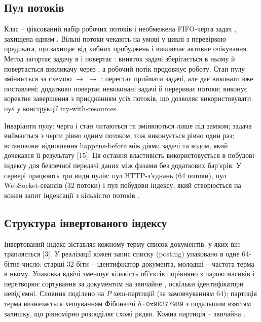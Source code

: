 \subsection{Пул потоків}

Клас  -- фіксований набір робочих потоків і необмежена FIFO-черга задач
, захищена одним . Вільні потоки чекають на
умові  у циклі з перевіркою предиката, що захищає від хибних пробуджень і
виключає активне очікування. Метод  загортає задачу в  і
повертає : виняток задачі зберігається в ньому й повертається викликачу через
, а робочий потік продовжує роботу. Стан пулу змінюється за схемою
 $\rightarrow$  $\rightarrow$ : 
перестає приймати задачі, але дає виконати вже поставлені;  додатково
повертає невиконані задачі й перериває потоки;  виконує коректне завершення з
приєднанням усіх потоків, що дозволяє використовувати пул у конструкції try-with-resources.

Інваріанти пулу: черга і стан читаються та змінюються лише під замком; задача виймається з
черги рівно одним потоком, тож виконується рівно один раз;  встановлює
відношення happens-before між діями задачі та кодом, який дочекався її результату [15]. Ця
остання властивість використовується в побудові індексу для безпечної передачі даних між
фазами без додаткових бар'єрів. У сервері працюють три види пулів: пул HTTP-з'єднань (64
потоки), пул WebSocket-сеансів (32 потоки) і пул побудови індексу, який створюється на кожен
запит індексації з кількістю потоків .

\subsection{Структура інвертованого індексу}

Інвертований індекс зіставляє кожному терму список документів, у яких він трапляється [3].
У реалізації кожен запис списку (posting) упаковано в одне 64-бітне число: старші 32 біти --
ідентифікатор документа, молодші -- частота терма в ньому. Упаковка вдвічі зменшує кількість
об'єктів порівняно з парою масивів і перетворює сортування за документом на звичайне
, оскільки ідентифікатори невід'ємні. Словник поділено на $P$
хеш-партицій (за замовчуванням 64); партиція терма визначається хешуванням Фібоначчі
$h \cdot \mathtt{0x9E3779B9}$ з подальшим взяттям залишку, що рівномірно розподіляє схожі
рядки. Кожна партиція -- звичайна .

